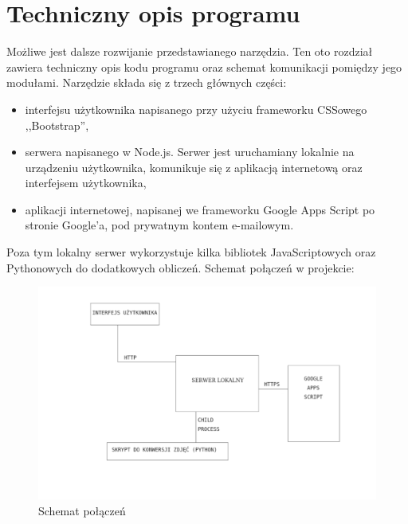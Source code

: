 \chapter{Techniczny opis programu} 
Możliwe jest dalsze rozwijanie przedstawianego narzędzia. Ten oto rozdział zawiera techniczny opis kodu programu oraz schemat komunikacji pomiędzy jego modułami.
\ind Narzędzie składa się z trzech głównych części:
\begin{itemize}
\item interfejsu użytkownika napisanego przy użyciu frameworku CSSowego ,,Bootstrap'',
\item serwera napisanego w Node.js. Serwer jest uruchamiany lokalnie na urządzeniu użytkownika, komunikuje się z aplikacją internetową oraz interfejsem użytkownika,
\item aplikacji internetowej, napisanej we frameworku Google Apps Script po stronie Google'a, pod prywatnym kontem e-mailowym.


\end{itemize}
Poza tym lokalny serwer wykorzystuje kilka bibliotek JavaScriptowych oraz Pythonowych do dodatkowych obliczeń. Schemat połączeń w projekcie:
\begin{figure}[H]
  \centering
  \includegraphics[scale=0.6]{schemat.png}
  \caption{Schemat połączeń}
  \label{fig:1}
\end{figure}
